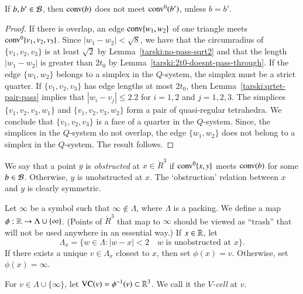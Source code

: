 \begin{lemma}\label{lemma:barrier-no-overlap} %
 If $b,b'\in {\mathcal B}$, then
${\operatorname{conv}}(b)$ does not meet ${\operatorname{conv}}^0(b')$, unless $b=b'$.
\end{lemma}

\begin{proof} If there is overlap, an edge ${\operatorname{conv}}\{w_1,w_2\}$ 
of one triangle meets ${\operatorname{conv}}^0\{v_1,v_2,v_3\}$.  Since
$|w_1-w_2|<\sqrt8$,  we have that the circumradius of
$\{v_1,v_2,v_3\}$ is at least $\sqrt2$ by
Lemma~\ref{tarski:no-pass-sqrt2} and that the length $|w_1-w_2|$ is
greater than $2t_0$ by Lemma~\ref{tarski:2t0-doesnt-pass-through}.
If the edge $\{w_1,w_2\}$ belongs to a simplex in the $Q$-system,
the simplex must be a strict quarter.  If $\{v_1,v_2,v_3\}$ has
edge lengths at most $2t_0$, then
Lemma~\ref{tarski:qrtet-pair-pass} implies that $|w_i-v_j|\le2.2$
for $i=1,2$ and $j=1,2,3$.   The simplices $\{v_1,v_2,v_3,w_1\}$
and $\{v_1,v_2,v_3,w_2\}$ form a pair of quasi-regular tetrahedra.
We conclude that $\{v_1,v_2,v_3\}$ is a face of a quarter in the
$Q$-system. Since, the simplices in the $Q$-system do not overlap,
the edge $\{w_1,w_2\}$ does not belong to a simplex in the
$Q$-system. The result follows.
\end{proof}



\begin{definition}[obstructed] \label{def:obstructed}
We say that a point $y$ is {\it obstructed\/} at $x\in\ring{R}^3$
if ${\operatorname{conv}}^0\{x,y\}$ meets ${\operatorname{conv}}(b)$ for some 
$b\in{\mathcal B}$. Otherwise, $y$ is unobstructed
at $x$.  The `obstruction' relation between $x$ and $y$ is clearly
symmetric.
\end{definition}

\begin{definition}[$\phi$]\label{def:trash-phi}
Let $\infty$ be a symbol such that $\infty\not\in\Lambda$,
where $\Lambda$ is a 
packing. We define a map
$\phi:{\mathbb R}\to\Lambda\cup\{\infty\}$.   (Points of $\ring{R}^3$ that
map to $\infty$ should be viewed as ``trash'' that will not be
used anywhere in an essential way.)  If $x\in {\mathbb R}$, let
   $$\Lambda_x = 
   \{w\in\Lambda : |w-x|<2 \quad \text{$w$ is unobstructed at $x$}\}.$$
If there exists a unique $v\in\Lambda_x$ closest to $x$, then set
$\phi(x) = v$. Otherwise, set $\phi(x) = \infty$.
\end{definition}

\begin{definition}[$V$-cell,~$VC$]\label{def:vcell}
For $v\in\Lambda\cup\{\infty\}$, 
let ${\operatorname{VC}}(v)=\phi^{-1}(v)\subset\mathbb{R}^3$.
We call it the {\it $V$-cell\/} at
$v$.
%
\end{definition}

